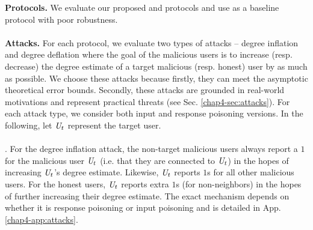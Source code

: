 \noindent \textbf{Protocols.} 
We evaluate our proposed \DegRRCheck{} and \DegHybrid{} protocols and use \DegRRNaive{} as a baseline protocol with poor robustness. %
\\\\
\noindent\textbf{Attacks.} For each protocol, we evaluate two types of attacks -- degree inflation and degree deflation where the goal of the malicious users is to increase (resp. decrease) the degree estimate of a target malicious (resp. honest) user by as much as possible.
 We choose these attacks because firstly, they can meet the asymptotic theoretical error bounds.
Secondly, these attacks are grounded in real-world motivations and represent practical threats (see Sec. \ref{chap4-sec:attacks}). For each attack type, we consider both input and response poisoning versions. In the following, let $\textit{U}_t$ represent the target user. 
\\\\
\noindent\DegRRCheck{}. For the degree inflation attack, the non-target malicious users always report a $1$  for the malicious user $\textit{U}_t$ (i.e. that they are connected to $\textit{U}_t$) in the hopes of increasing $\textit{U}_t$'s degree estimate.
Likewise, $\textit{U}_t$ reports $1$s for all other malicious users. For the honest users, $\textit{U}_t$ reports extra $1$s (for non-neighbors) in the hopes of further increasing their degree estimate. The exact mechanism depends on whether it is response poisoning or input poisoning and is detailed in App. \ref{chap4-app:attacks}.

